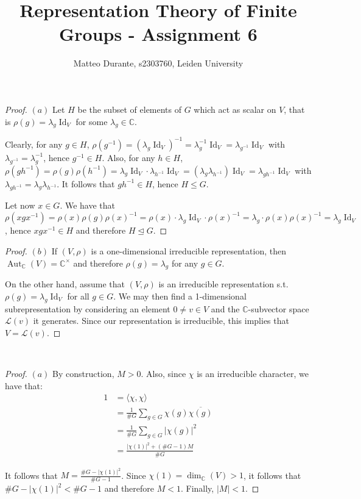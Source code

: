 \documentclass{article}
\newcommand{\numberset}{\mathbb}
\newcommand{\C}{\numberset{C}}
\newcommand{\exercise}[1]{\noindent {\bf Exercise #1}}
\DeclareMathOperator{\Id}{Id}
\DeclareMathOperator{\Aut}{Aut}
\begin{document}
\title{Representation Theory of Finite Groups - Assignment 6}

\author{Matteo Durante, s2303760, Leiden University}

\maketitle


\exercise{11.3}

\begin{proof}
    $(a)$ Let $H$ be the subset of elements of $G$ which act as scalar on $V$,
    that is $\rho(g)=\lambda_g\Id_V$ for some $\lambda_g\in\C$.
    
    Clearly, for any $g\in H$, $\rho(g^{-1})=(\lambda_g\Id_V)^{-1}=
    \lambda^{-1}_g\Id_V=\lambda_{g^{-1}}\Id_V$ with $\lambda_{g^{-1}}=
    \lambda_g^{-1}$, hence $g^{-1}\in H$. Also, for any $h\in H$,
    $\rho(gh^{-1})=\rho(g)\rho(h^{-1})=\lambda_g\Id_V\cdot\lambda_{h^{-1}}\Id_V=
    (\lambda_g\lambda_{h^{-1}})\Id_V=\lambda_{gh^{-1}}\Id_V$
    with $\lambda_{gh^{-1}}=\lambda_g\lambda_{h^{-1}}$. It follows that
    $gh^{-1}\in H$, hence $H\leq G$.

    Let now $x\in G$. We have that
    $\rho(xgx^{-1})=\rho(x)\rho(g)\rho(x)^{-1}=
    \rho(x)\cdot\lambda_g\Id_V\cdot\rho(x)^{-1}=
    \lambda_g\cdot\rho(x)\rho(x)^{-1}=\lambda_g\Id_V$, hence $xgx^{-1}\in H$ and
    therefore $H\trianglelefteq G$.
\end{proof}

\begin{proof}
    $(b)$ If $(V,\rho)$ is a one-dimensional irreducible representation, then
    $\Aut_\C(V)=\C^\times$ and therefore $\rho(g)=\lambda_g$ for any $g\in G$.

    On the other hand, assume that $(V,\rho)$ is an irreducible representation
    s.t. $\rho(g)=\lambda_g\Id_V$ for all $g\in G$. We may then find a
    1-dimensional subrepresentation by considering an element $0\neq v\in V$ and
    the $\C$-subvector space $\mathcal{L}(v)$ it generates. Since our
    representation is irreducible, this implies that $V=\mathcal{L}(v)$.
\end{proof}


~\\
\exercise{11.6}

\begin{proof}
    $(a)$ By construction, $M>0$. Also, since $\chi$ is an irreducible
    character, we have that:
    \begin{align*}
        1 &=\langle\chi,\chi\rangle \\
        &=\frac{1}{\#G}\sum_{g\in G}\chi(g)\overline{\chi(g)} \\
        &=\frac{1}{\#G}\sum_{g\in G}|\chi(g)|^2 \\
        &=\frac{|\chi(1)|^2+(\#G-1)M}{\#G}
    \end{align*}

    It follows that $M=\frac{\#G-|\chi(1)|^2}{\#G-1}$. Since
    $\chi(1)=\dim_\C(V)>1$, it follows that $\#G-|\chi(1)|^2<\#G-1$ and
    therefore $M<1$. Finally, $|M|<1$.
\end{proof}
\end{document}
